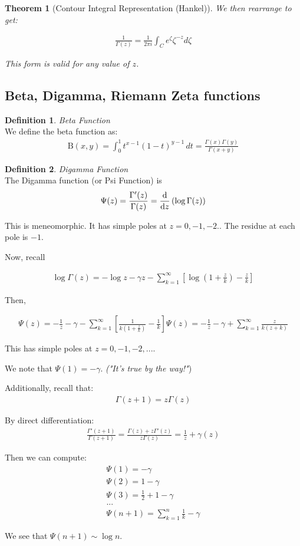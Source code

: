 \documentclass{article}
\newtheorem{theorem}{Theorem}[section]
\theoremstyle{definition}
\newtheorem{definition}{Definition}[section]
\newcommand{\Def}[2]{
\begin{shaded*}
\begin{definition}{\textit{#1}}\\#2\end{definition}
\end{shaded*}
}
\begin{document}
\begin{theorem}[Contour Integral Representation (Hankel)]
We then rearrange to get:

\begin{align*}
\frac{1}{\Gamma(z)} = \frac{1}{2\pi i } \int_{C} e^\zeta \zeta ^{-z} d\zeta 
\end{align*}

This form is valid for any value of $z$.
\end{theorem}

\subsection{Beta, Digamma, Riemann Zeta functions}

\Def{Beta Function}{
We define the beta function as:
\begin{align*}
 \mathrm{B} (x,y)=\int _{0}^{1}t^{x-1}(1-t)^{y-1}\,dt
 = \frac{\Gamma(x)\Gamma(y)}{\Gamma(x+y)}
  \end{align*}
}

\Def{Digamma Function}{
The Digamma function (or Psi Function) is
\begin{align*}
\Psi (z) = \frac{\Gamma'(z)}{\Gamma(z)} = \dv{z} \left(\log \Gamma(z)\right)
\end{align*}

This is meneomorphic. It has simple poles at $z=0, -1, -2..$ The residue at each pole is $-1$. 

Now, recall

\begin{align*}
\log \Gamma(z) = -\log z - \gamma z - \sum_{k=1}^\infty \left[\log(1+\frac{z}{k}) - \frac{z}{k}\right]
\end{align*}

Then, 

\begin{align*}
\Psi(z) = - \frac{1}{z} - \gamma  - \sum_{k=1}^\infty \left[\frac{1}{k(1+\frac{z}{k})} - \frac{1}{k}\right]
\Psi(z) = - \frac{1}{z} - \gamma  + \sum_{k=1}^\infty \frac{z}{k(z+k)}
\end{align*}

This has simple poles at $z=0,-1,-2,...$. 

We note that $\Psi(1) = -\gamma$. \textit{("It's true by the way!"}) 

Additionally, recall that:
\begin{align*}
\Gamma(z+1) = z\Gamma(z) 
\end{align*}

By direct differentiation:
\begin{align*}
\frac{\Gamma'(z+1)}{\Gamma(z+1)} = \frac{\Gamma(z) + z \Gamma'(z)}{z \Gamma(z)} = \frac{1}{z} + \gamma(z)
\end{align*}

Then we can compute:
\begin{align*}
\Psi(1) = -\gamma\\
\Psi(2) = 1-\gamma \\ 
\Psi(3) = \frac{1}{2} + 1 - \gamma \\
...\\
\Psi(n+1) = \sum_{k=1}^{n} \frac{1}{k} - \gamma
\end{align*}

We see that $\Psi(n+1) \sim \log n$. 
}
\end{document}
